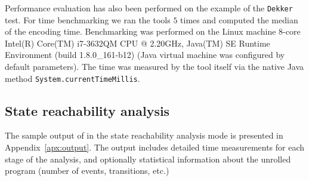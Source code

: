 Performance evaluation has also been performed on the example of the \texttt{Dekker} test.
For time benchmarking we ran the tools $5$ times and computed the median of the encoding time.
Benchmarking was performed on the Linux machine 8-core Intel(R) Core(TM) i7-3632QM CPU @ 2.20GHz, Java(TM) SE Runtime Environment (build 1.8.0\_161-b12) (Java virtual machine was configured by default parameters).
The time was measured by the tool itself via the native Java method \texttt{System.currentTimeMillis}.

\subsection{State reachability analysis}
\label{ch:eval:perf:reach}



The sample output of \porthos[2] in the state reachability analysis mode is presented in Appendix~\ref{apx:output}.
The output includes detailed time measurements for each stage of the analysis, and optionally statistical information about the unrolled program (number of events, transitions, etc.)


